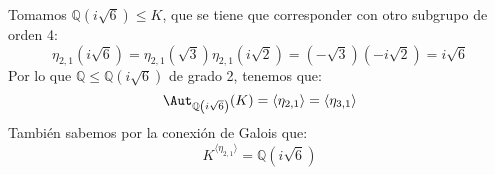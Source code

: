 \begin{ejemplo}
    \noindent
    Tomamos $\mathbb{Q}(i\sqrt{6})\leq K$, que se tiene que corresponder con otro subgrupo de orden 4: 
    \begin{equation*}
        \eta_{2,1}(i\sqrt{6}) = \eta_{2,1}(\sqrt{3})\eta_{2,1}(i\sqrt{2}) = (-\sqrt{3})(-i\sqrt{2}) = i\sqrt{6}
    \end{equation*}
    Por lo que $\mathbb{Q}\leq \mathbb{Q}(i\sqrt{6})$ de grado 2, tenemos que:
    \begin{equation*}
        \Aut_{\mathbb{Q}\left(i\sqrt{6}\right)}(K) = \langle \eta_{2,1} \rangle  = \langle \eta_{3,1} \rangle 
    \end{equation*}
    También sabemos por la conexión de Galois que:
    \begin{equation*}
        K^{\langle \eta_{2,1} \rangle } = \mathbb{Q}(i\sqrt{6})
    \end{equation*}
\end{ejemplo}
